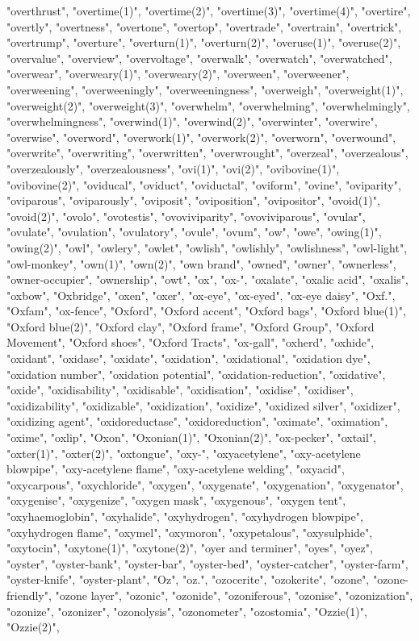 "overthrust",
"overtime(1)",
"overtime(2)",
"overtime(3)",
"overtime(4)",
"overtire",
"overtly",
"overtness",
"overtone",
"overtop",
"overtrade",
"overtrain",
"overtrick",
"overtrump",
"overture",
"overturn(1)",
"overturn(2)",
"overuse(1)",
"overuse(2)",
"overvalue",
"overview",
"overvoltage",
"overwalk",
"overwatch",
"overwatched",
"overwear",
"overweary(1)",
"overweary(2)",
"overween",
"overweener",
"overweening",
"overweeningly",
"overweeningness",
"overweigh",
"overweight(1)",
"overweight(2)",
"overweight(3)",
"overwhelm",
"overwhelming",
"overwhelmingly",
"overwhelmingness",
"overwind(1)",
"overwind(2)",
"overwinter",
"overwire",
"overwise",
"overword",
"overwork(1)",
"overwork(2)",
"overworn",
"overwound",
"overwrite",
"overwriting",
"overwritten",
"overwrought",
"overzeal",
"overzealous",
"overzealously",
"overzealousness",
"ovi(1)",
"ovi(2)",
"ovibovine(1)",
"ovibovine(2)",
"oviducal",
"oviduct",
"oviductal",
"oviform",
"ovine",
"oviparity",
"oviparous",
"oviparously",
"oviposit",
"oviposition",
"ovipositor",
"ovoid(1)",
"ovoid(2)",
"ovolo",
"ovotestis",
"ovoviviparity",
"ovoviviparous",
"ovular",
"ovulate",
"ovulation",
"ovulatory",
"ovule",
"ovum",
"ow",
"owe",
"owing(1)",
"owing(2)",
"owl",
"owlery",
"owlet",
"owlish",
"owlishly",
"owlishness",
"owl-light",
"owl-monkey",
"own(1)",
"own(2)",
"own brand",
"owned",
"owner",
"ownerless",
"owner-occupier",
"ownership",
"owt",
"ox",
"ox-",
"oxalate",
"oxalic acid",
"oxalis",
"oxbow",
"Oxbridge",
"oxen",
"oxer",
"ox-eye",
"ox-eyed",
"ox-eye daisy",
"Oxf.",
"Oxfam",
"ox-fence",
"Oxford",
"Oxford accent",
"Oxford bags",
"Oxford blue(1)",
"Oxford blue(2)",
"Oxford clay",
"Oxford frame",
"Oxford Group",
"Oxford Movement",
"Oxford shoes",
"Oxford Tracts",
"ox-gall",
"oxherd",
"oxhide",
"oxidant",
"oxidase",
"oxidate",
"oxidation",
"oxidational",
"oxidation dye",
"oxidation number",
"oxidation potential",
"oxidation-reduction",
"oxidative",
"oxide",
"oxidisability",
"oxidisable",
"oxidisation",
"oxidise",
"oxidiser",
"oxidizability",
"oxidizable",
"oxidization",
"oxidize",
"oxidized silver",
"oxidizer",
"oxidizing agent",
"oxidoreductase",
"oxidoreduction",
"oximate",
"oximation",
"oxime",
"oxlip",
"Oxon",
"Oxonian(1)",
"Oxonian(2)",
"ox-pecker",
"oxtail",
"oxter(1)",
"oxter(2)",
"oxtongue",
"oxy-",
"oxyacetylene",
"oxy-acetylene blowpipe",
"oxy-acetylene flame",
"oxy-acetylene welding",
"oxyacid",
"oxycarpous",
"oxychloride",
"oxygen",
"oxygenate",
"oxygenation",
"oxygenator",
"oxygenise",
"oxygenize",
"oxygen mask",
"oxygenous",
"oxygen tent",
"oxyhaemoglobin",
"oxyhalide",
"oxyhydrogen",
"oxyhydrogen blowpipe",
"oxyhydrogen flame",
"oxymel",
"oxymoron",
"oxypetalous",
"oxysulphide",
"oxytocin",
"oxytone(1)",
"oxytone(2)",
"oyer and terminer",
"oyes",
"oyez",
"oyster",
"oyster-bank",
"oyster-bar",
"oyster-bed",
"oyster-catcher",
"oyster-farm",
"oyster-knife",
"oyster-plant",
"Oz",
"oz.",
"ozocerite",
"ozokerite",
"ozone",
"ozone-friendly",
"ozone layer",
"ozonic",
"ozonide",
"ozoniferous",
"ozonise",
"ozonization",
"ozonize",
"ozonizer",
"ozonolysis",
"ozonometer",
"ozostomia",
"Ozzie(1)",
"Ozzie(2)",
